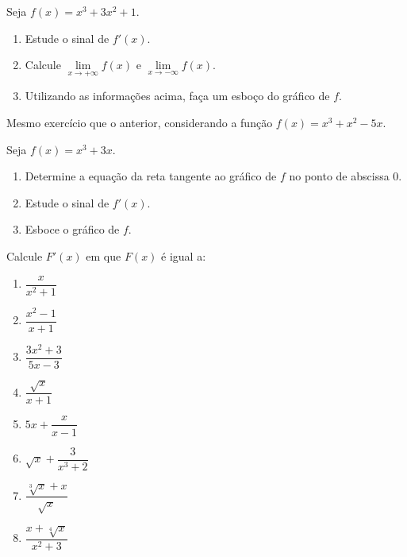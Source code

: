 \begin{exercicio}[4]
\label{ex:7.7.4}
Seja $f(x) = x^3 + 3x^2 + 1$.
\begin{enumerate}[label=\alph*)]
    \item Estude o sinal de $f'(x)$.
    \item Calcule $\lim\limits_{x \to +\infty} f(x)$ e $\lim\limits_{x \to -\infty} f(x)$.
    \item Utilizando as informações acima, faça um esboço do gráfico de $f$.
\end{enumerate}
\end{exercicio}

\begin{exercicio}[5]
\label{ex:7.7.5}
Mesmo exercício que o anterior, considerando a função $f(x) = x^3 + x^2 - 5x$.
\end{exercicio}

\begin{exercicio}[6]
\label{ex:7.7.6}
Seja $f(x) = x^3 + 3x$.
\begin{enumerate}[label=\alph*)]
    \item Determine a equação da reta tangente ao gráfico de $f$ no ponto de abscissa 0.
    \item Estude o sinal de $f'(x)$.
    \item Esboce o gráfico de $f$.
\end{enumerate}
\end{exercicio}

\begin{exercicio}[7]
\label{ex:7.7.7}
Calcule $F'(x)$ em que $F(x)$ é igual a:
\begin{enumerate}[label=\alph*)]
    \item $\dfrac{x}{x^2 + 1}$
    \item $\dfrac{x^2 - 1}{x + 1}$
    \item $\dfrac{3x^2 + 3}{5x - 3}$
    \item $\dfrac{\sqrt{x}}{x + 1}$
    \item $5x + \dfrac{x}{x - 1}$
    \item $\sqrt{x} + \dfrac{3}{x^3 + 2}$
    \item $\dfrac{\sqrt[3]{x} + x}{\sqrt{x}}$
    \item $\dfrac{x + \sqrt[4]{x}}{x^2 + 3}$
\end{enumerate}
\end{exercicio}

